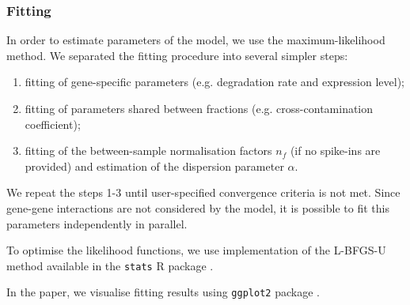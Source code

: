 \subsubsection{Fitting}
In order to estimate parameters of the model, we use the maximum-likelihood method.
We separated the fitting procedure into several simpler steps:
\begin{enumerate}
 \item fitting of gene-specific parameters (e.g. degradation rate and expression level);
 \item fitting of parameters shared between fractions (e.g. cross-contamination coefficient); 
 \item fitting of the between-sample normalisation factors $n_f$
 (if no spike-ins are provided) and estimation of the dispersion parameter $\alpha$.
\end{enumerate}
We repeat the steps 1-3 until
user-specified convergence criteria is not met.
 Since gene-gene interactions are not considered by the model, it is possible to 
 fit this parameters independently in parallel. 

To optimise the likelihood functions, 
we use implementation of the {L-BFGS-U} method \citep{byrd1995limited} 
available in the \verb|stats| R package \citep{rlang}.

\par In the paper, we visualise fitting results using \verb|ggplot2| package 
\citep{ggplot2}.